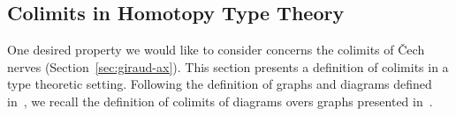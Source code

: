 \documentclass[preprint,9pt,numbers]{sigplanconf}
\newtheorem{defi}[thm]{Definition}
\begin{document}

\subsection{Colimits in Homotopy Type Theory }
\label{sec:colim-homot-type}

One desired property we would like to consider concerns the colimits
of \v{C}ech nerves (Section~\ref{sec:giraud-ax}). This section presents
a definition of colimits in a type theoretic setting.
% 
Following the definition of graphs and diagrams defined
in~\cite{lumsdaine}, we recall the definition of colimits of
diagrams overs graphs presented in~\cite{sets_in_hott}. 
%


\end{document}

